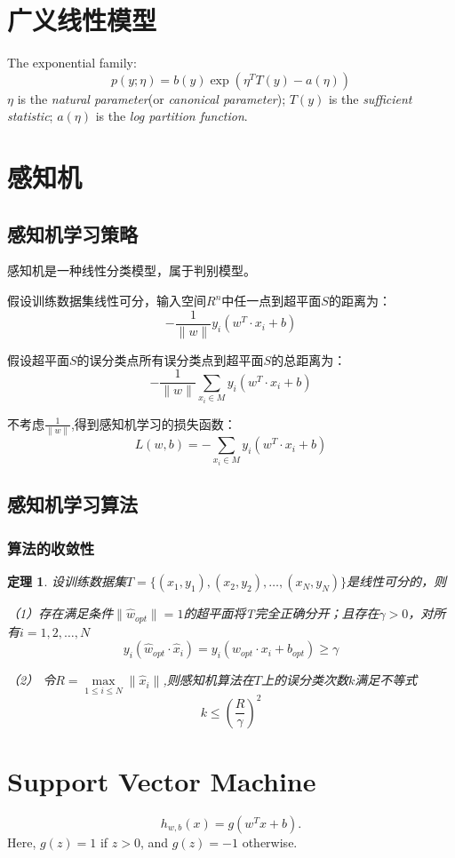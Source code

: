 \documentclass[UTF8]{ctexart}
\newtheorem{theorem}{定理}[section]
\begin{document}
	
	\section{广义线性模型}
	The exponential family:
	\begin{equation*}
		p(y;\eta)=b(y)\exp(\eta^TT(y)-a(\eta))
	\end{equation*}
	$\eta$ is the \emph{natural parameter}(or \emph{canonical parameter}); $T(y)$ is the \emph{sufficient statistic}; $a(\eta)$ is the \emph{log partition function}.
	
	
	\section{感知机}
	\subsection{感知机学习策略}

	感知机是一种线性分类模型，属于判别模型。
	
	假设训练数据集线性可分，输入空间$R^n$中任一点到超平面$S$的距离为：
	\[
		-\frac{1}{\|w\|}y_i(w^T\cdot{x_i}+b)
	\]
	
	假设超平面$S$的误分类点所有误分类点到超平面$S$的总距离为：
	\[
		-\frac{1}{\|w\|}\sum_{x_i\in{M}}y_i(w^T\cdot{x_i}+b)
	\]
	
	不考虑$\frac{1}{\|w\|}$,得到感知机学习的损失函数：
	\[
		L(w,b)=-\sum_{x_i\in{M}}y_i(w^T\cdot{x_i}+b)
	\]
	
	\subsection{感知机学习算法}
	\subsubsection{算法的收敛性}
	\begin{theorem}
		设训练数据集$T=\{(x_1,y_1),(x_2,y_2),\dots,(x_N,y_N)\}$是线性可分的，则
		
		（1）存在满足条件$\|\hat{w}_{opt}\|=1$的超平面将T完全正确分开；且存在$\gamma>0$，对所有$i=1,2,\dots,N$
		\[
			y_i(\hat{w}_{opt}\cdot\hat{x}_i)=y_i(w_{opt}\cdot x_i+b_{opt})\geq\gamma
		\]
		
		（2） 令$R=\max\limits_{1\leq i \leq N}\|\hat{x}_i\|$,则感知机算法在$T$上的误分类次数$k$满足不等式
		\[
			k\leq(\frac{R}{\gamma})^2
		\]
	\end{theorem}

	\section{Support Vector Machine}
	\begin{equation*}
		h_{w, b}(x) = g(w^Tx + b).
	\end{equation*}
	Here, $g(z)=1$ if $z>0$, and $g(z)=-1$ otherwise.
	
\end{document}
